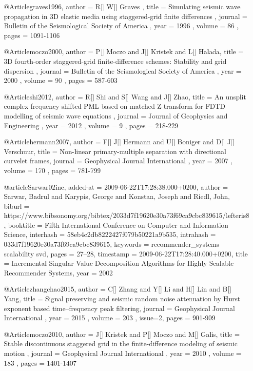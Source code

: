 {@Article{graves1996,
 author =  { R[] W[] Graves },
 title =   { Simulating seismic wave propagation in 3{D} elastic media using staggered-grid finite differences },
 journal = { Bulletin of the Seismological Society of America },
 year =    { 1996 },
 volume =  { 86 },
 pages =   { 1091-1106 }
}

@Article{moczo2000,
 author =  {  P[] Moczo and J[] Kristek and L[] Halada},
 title =   { 3{D} fourth-order staggered-grid finite-difference schemes: Stability and grid dispersion },
 journal = { Bulletin of the Seismological Society of America },
 year =    { 2000 },
 volume =  { 90 },
 pages =   { 587-603 }
}


@Article{shi2012,
 author =  {  R[] Shi and S[] Wang and J[] Zhao},
 title =   {An unsplit complex-frequency-shifted PML based on matched Z-transform for FDTD modelling of seismic wave equations },
 journal = { Journal of Geophysics and Engineering },
 year =    { 2012 },
 volume =  { 9 },
 pages =   { 218-229 }
}

@Article{hermann2007,
 author =  {  F[] J[] Hermann and U[] Boniger and D[] J[] Verschuur},
 title =   {Non-linear primary-multiple separation with directional curvelet frames},
 journal = { Geophysical Journal International },
 year =    { 2007 },
 volume =  { 170 },
 pages =   { 781-799 }
}

@article{Sarwar02inc,
  added-at = {2009-06-22T17:28:38.000+0200},
  author = {Sarwar, Badrul and Karypis, George and Konstan, Joseph and Riedl, John},
  biburl = {https://www.bibsonomy.org/bibtex/2033d7f19620e30a73f69ca9cbc839615/lefteris8},
  booktitle = {Fifth International Conference on Computer and Information Science},
  interhash = {58eb4c2db8222427f079b50221a9b535},
  intrahash = {033d7f19620e30a73f69ca9cbc839615},
  keywords = {recommender_systems scalability svd},
  pages = {27--28},
  timestamp = {2009-06-22T17:28:40.000+0200},
  title = {Incremental Singular Value Decomposition Algorithms for Highly Scalable
	Recommender Systems},
  year = 2002
}

@Article{zhangchao2015,
 author =  {  C[] Zhang and Y[] Li and H[] Lin and B[] Yang},
 title =   {Signal preserving and seismic random noise attenuation by Hurst exponent based time–frequency peak filtering},
 journal = { Geophysical Journal International },
 year =    { 2015 },
 volume =  { 203 },
 issue=2,
 pages =   { 901-909 }
}



@Article{moczo2010,
 author =  {  J[] Kristek and P[] Moczo and M[] Galis},
 title =   {Stable discontinuous staggered grid in the finite-difference modeling of seismic motion },
 journal = { Geophysical Journal International },
 year =    { 2010 },
 volume =  { 183 },
 pages =   { 1401-1407 }
}

}
